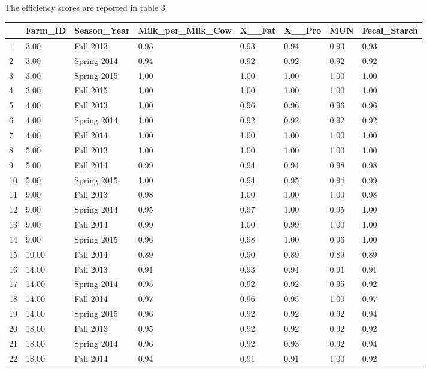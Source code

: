 \documentclass[12pt,]{article}
\begin{document}
The efficiency scores are reported in table 3.
\begin{longtable}{l|l|l|l|l|l|l|l}
  \hline
 & Farm\_ID & Season\_Year & Milk\_per\_Milk\_Cow & X\_\_Fat & X\_\_Pro & MUN & Fecal\_Starch \\ 
  \hline
1 & 3.00 & Fall 2013 & 0.93 & 0.93 & 0.94 & 0.93 & 0.93 \\ 
  2 & 3.00 & Spring 2014 & 0.94 & 0.92 & 0.92 & 0.92 & 0.92 \\ 
  3 & 3.00 & Spring 2015 & 1.00 & 1.00 & 1.00 & 1.00 & 1.00 \\ 
  4 & 3.00 & Fall 2015 & 1.00 & 1.00 & 1.00 & 1.00 & 1.00 \\ 
  5 & 4.00 & Fall 2013 & 1.00 & 0.96 & 0.96 & 0.96 & 0.96 \\ 
  6 & 4.00 & Spring 2014 & 1.00 & 0.92 & 0.92 & 0.92 & 0.92 \\ 
  7 & 4.00 & Fall 2014 & 1.00 & 1.00 & 1.00 & 1.00 & 1.00 \\ 
  8 & 5.00 & Fall 2013 & 1.00 & 1.00 & 1.00 & 1.00 & 1.00 \\ 
  9 & 5.00 & Fall 2014 & 0.99 & 0.94 & 0.94 & 0.98 & 0.98 \\ 
  10 & 5.00 & Spring 2015 & 1.00 & 0.94 & 0.95 & 0.94 & 0.99 \\ 
  11 & 9.00 & Fall 2013 & 0.98 & 1.00 & 1.00 & 1.00 & 0.98 \\ 
  12 & 9.00 & Spring 2014 & 0.95 & 0.97 & 1.00 & 0.95 & 1.00 \\ 
  13 & 9.00 & Fall 2014 & 0.99 & 1.00 & 0.99 & 1.00 & 1.00 \\ 
  14 & 9.00 & Spring 2015 & 0.96 & 0.98 & 1.00 & 0.96 & 1.00 \\ 
  15 & 10.00 & Fall 2014 & 0.89 & 0.90 & 0.89 & 0.89 & 0.89 \\ 
  16 & 14.00 & Fall 2013 & 0.91 & 0.93 & 0.94 & 0.91 & 0.91 \\ 
  17 & 14.00 & Spring 2014 & 0.95 & 0.92 & 0.92 & 0.95 & 0.92 \\ 
  18 & 14.00 & Fall 2014 & 0.97 & 0.96 & 0.95 & 1.00 & 0.97 \\ 
  19 & 14.00 & Spring 2015 & 0.96 & 0.92 & 0.92 & 0.92 & 0.94 \\ 
  20 & 18.00 & Fall 2013 & 0.95 & 0.92 & 0.92 & 0.92 & 0.92 \\ 
  21 & 18.00 & Spring 2014 & 0.96 & 0.92 & 0.93 & 0.92 & 0.94 \\ 
  22 & 18.00 & Fall 2014 & 0.94 & 0.91 & 0.91 & 1.00 & 0.92 \\ 

\end{longtable}
\end{document}
